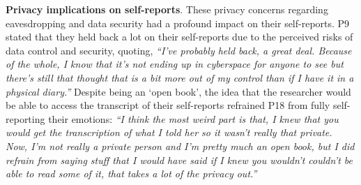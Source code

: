     	
    \textbf{Privacy implications on self-reports}.
    These privacy concerns regarding eavesdropping and data security had a profound impact on their self-reports. P9 stated that they held back a lot on their self-reports due to the perceived risks of data control and security, quoting,
            \textit{``I've probably held back, a great deal. Because of the whole, I know that it's not ending up in cyberspace for anyone to see but there's still that thought that is a bit more out of my control than if I have it in a physical diary.''}
    Despite being an `open book', the idea that the researcher would be able to access the transcript of their self-reports refrained P18 from fully self-reporting their emotions:
            \textit{``I think the most weird part is that, I knew that you would get the transcription of what I told her so it wasn't really that private. Now, I'm not really a private person and I'm pretty much an open book, but I did refrain from saying stuff that I would have said if I knew you wouldn't couldn't be able to read some of it, that takes a lot of the privacy out.''
            }
    
